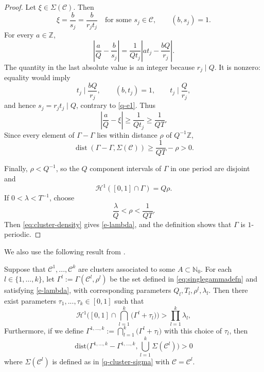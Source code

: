 \documentclass[12pt]{amsart}
\numberwithin{equation}{section}
\newcommand{\calC}{\mathcal{C}}
\begin{document}
\begin{proof}
Let $\xi\in\Sigma(\calC)$.  Then
\[
 \xi=\frac{b}{s_j}=\frac{b}{r_jt_j}
 \quad\text{for some }s_j\in\calC,
 \qquad (b,s_j)=1.
\]
For every $a\in\mathbb Z$,
\begin{equation}\label{eq:cluster-rational-separation}
 \left|\frac aQ-\frac b{s_j}\right|
 =\frac1{Qt_j}
 \left|at_j-\frac{bQ}{r_j}\right|.
\end{equation}
The quantity in the last absolute value is an integer because $r_j\mid Q$.
It is nonzero: equality would imply
\[
 t_j\mid\frac{bQ}{r_j},
 \qquad (b,t_j)=1,
 \qquad t_j\mid\frac Q{r_j},
\]
and hence $s_j=r_jt_j\mid Q$, contrary to \eqref{q-e1}.  Thus
\[
 \left|\frac aQ-\xi\right|
 \geq\frac1{Qt_j}\geq\frac1{QT}.
\]
Since every element of $\Gamma-\Gamma$ lies within distance $\rho$ of
$Q^{-1}\mathbb Z$,
\[
 \operatorname{dist}(\Gamma-\Gamma,\Sigma(\calC))
 \geq\frac1{QT}-\rho>0.
\]

Finally, $\rho<Q^{-1}$, so the $Q$ component intervals of $\Gamma$ in one
period are disjoint and
\begin{equation}\label{eq:cluster-density}
 \mathcal H^1([0,1]\cap\Gamma)=Q\rho.
\end{equation}
If $0<\lambda<T^{-1}$, choose
\[
 \frac{\lambda}{Q}<\rho<\frac1{QT}.
\]
Then \eqref{eq:cluster-density} gives \eqref{e-lambda}, and the definition
shows that $\Gamma$ is $1$-periodic.
\end{proof}


We also use the following result from \cite{LM}.

\medskip

\begin{lemma}\label{q-lemma3}
Suppose that $\mathcal{C}^1, ..., \mathcal{C}^k$ are clusters associated to some $A \subset \mathbb{N}_{0}$. For each $l\in\{1,\dots,k\}$, let $\Gamma^l:=\Gamma(\mathcal{C}^l,\rho^l)$ be the set defined in \eqref{eq:singlegammadefn} and satisfying \eqref{e-lambda}, with corresponding parameters $Q_l, T_l, \rho^l, \lambda_l$. Then there exist parameters $\tau_1, ..., \tau_k \in [0,1]$ such that
\begin{equation}\label{q-e4}
\mathcal{H}^1\bigg( [0,1] \cap  \bigcap_{l=1}^{k} \big( \Gamma^l+ \tau_l \big)  \bigg) > \prod_{l = 1}^{k} \lambda_l,
\end{equation}
Furthermore, if we define $\Gamma^{1,\dots,k}:=  \bigcap_{l=1}^{k} \big( \Gamma^l+ \tau_l \big)$ with this choice of $\tau_l$, then
\begin{equation}\label{q-e4a}
\text{dist} \big( \Gamma^{1,\dots,k} -  \Gamma^{1,\dots,k}, \bigcup_{l=1}^k \Sigma(\mathcal{C}^l) \big) > 0
\end{equation}
where $\Sigma(\mathcal{C}^l)$ is defined as in \eqref{q-cluster-sigma} with $
\mathcal{C}=\mathcal{C}^l$.
\end{lemma}
\end{document}
